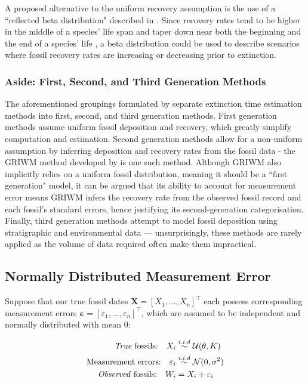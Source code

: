 A proposed alternative to the uniform recovery assumption is the use of a ``reflected beta distribution" described in \textcite{Wang2016}. Since recovery rates tend to be higher in the middle of a species' life span and taper down near both the beginning and the end of a species' life \parencite{Lee2010}, a beta distribution could be used to describe scenarios where fossil recovery rates are increasing or decreasing prior to extinction.

\subsubsection{Aside: First, Second, and Third Generation Methods}

The aforementioned groupings formulated by \textcite{WangMarshall2016} separate extinction time estimation methods into first, second, and third generation methods. First generation methods assume uniform fossil deposition and recovery, which greatly simplify computation and estimation. Second generation methods allow for a non-uniform assumption by inferring deposition and recovery rates from the fossil data - the GRIWM method developed by \textcite{Bradshaw2012} is one such method. Although GRIWM also implicitly relies on a uniform fossil distribution, meaning it should be a ``first generation" model, it can be argued that its ability to account for measurement error means GRIWM infers the recovery rate from the observed fossil record and each fossil's standard errors, hence justifying its second-generation categorisation. Finally, third generation methods attempt to model fossil deposition using stratigraphic and environmental data --- unsurprisingly, these methods are rarely applied as the volume of data required often make them impractical.

\subsection{Normally Distributed Measurement Error}

Suppose that our true fossil dates $\bm{X} = [X_1, \dots, X_n]^\top$ each possess corresponding measurement errors $\bm{\varepsilon} = [\varepsilon_1, \dots, \varepsilon_n]^\top$, which are assumed to be independent and normally distributed with mean 0:

\begin{align*}
    \text{\textit{True} fossils:} \quad X_i  &\overset{i.i.d}{\sim} \mathcal{U}(\theta, K) \\
    \text{Measurement errors:} \quad \varepsilon_i &\overset{i.i.d}{\sim} \mathcal{N}(0, \sigma^2) \\
    \text{\textit{Observed} fossils:} \quad W_i &= X_i + \varepsilon_i 
\end{align*}


